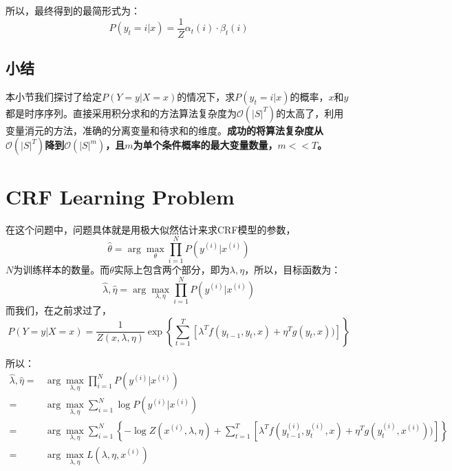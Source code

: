 \documentclass[a4paper]{article}
\begin{document}
所以，最终得到的最简形式为：
\begin{equation}
    P(y_t=i|x) = \frac{1}{Z} \alpha_t(i) \cdot \beta_t(i)
\end{equation}

\subsection{小结}
本小节我们探讨了给定$P(Y=y|X=x)$的情况下，求$P(y_t=i|x)$的概率，$x$和$y$都是时序序列。直接采用积分求和的方法算法复杂度为$\mathcal{O}(|S|^T)$的太高了，利用变量消元的方法，准确的分离变量和待求和的维度。\textbf{成功的将算法复杂度从$\mathcal{O}(|S|^T)$降到$\mathcal{O}(|S|^m)$，且$m$为单个条件概率的最大变量数量，$m << T$。}

\section{CRF Learning Problem}
在这个问题中，问题具体就是用极大似然估计来求CRF模型的参数，
\begin{equation}
    \hat{\theta} = \arg\max_{\theta} \prod_{i=1}^N P(y^{(i)}|x^{(i)})
\end{equation}
$N$为训练样本的数量。而$\theta$实际上包含两个部分，即为$\lambda,\eta$，所以，目标函数为：
\begin{equation}
    \hat{\lambda},\hat{\eta} = \arg\max_{\lambda,\eta} \prod_{i=1}^N P(y^{(i)}|x^{(i)})
\end{equation}
而我们，在之前求过了，
\begin{equation}
     P(Y=y|X=x) = \frac{1}{Z(x,\lambda,\eta)} \exp \left\{ \sum_{t=1}^T \left[ \lambda^T f(y_{t-1},y_t,x) + \eta^T g(y_t,x)) \right] \right\}
\end{equation}

所以：
\begin{equation}
    \begin{split}
        \hat{\lambda},\hat{\eta} = & \arg\max_{\lambda,\eta} \prod_{i=1}^N P(y^{(i)}|x^{(i)}) \\
        = & \arg\max_{\lambda,\eta} \sum_{i=1}^N \log P(y^{(i)}|x^{(i)}) \\
        = & \arg\max_{\lambda,\eta} \sum_{i=1}^N \left\{ 
        -\log Z(x^{(i)},\lambda,\eta) + \sum_{t=1}^T \left[ \lambda^T f(y_{t-1}^{(i)},y_t^{(i)},x) + \eta^T g(y_t^{(i)},x^{(i)})) \right]
        \right\} \\
        = & \arg\max_{\lambda,\eta} L(\lambda,\eta,x^{(i)}) 
    \end{split}
\end{equation}
\end{document}
